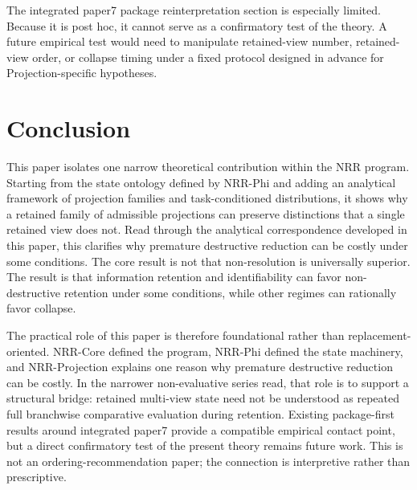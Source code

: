 \documentclass[11pt,a4paper]{article}
\begin{document}
The integrated paper7 package reinterpretation section is especially limited. Because it is post hoc, it cannot serve as a confirmatory test of the theory. A future empirical test would need to manipulate retained-view number, retained-view order, or collapse timing under a fixed protocol designed in advance for Projection-specific hypotheses.

\section{Conclusion}
\label{sec:conclusion}

This paper isolates one narrow theoretical contribution within the NRR program. Starting from the state ontology defined by NRR-Phi \cite{saito2026phi} and adding an analytical framework of projection families and task-conditioned distributions, it shows why a retained family of admissible projections can preserve distinctions that a single retained view does not. Read through the analytical correspondence developed in this paper, this clarifies why premature destructive reduction can be costly under some conditions. The core result is not that non-resolution is universally superior. The result is that information retention and identifiability can favor non-destructive retention under some conditions, while other regimes can rationally favor collapse.

The practical role of this paper is therefore foundational rather than replacement-oriented. NRR-Core \cite{saito2025nrr} defined the program, NRR-Phi \cite{saito2026phi} defined the state machinery, and NRR-Projection explains one reason why premature destructive reduction can be costly. In the narrower non-evaluative series read, that role is to support a structural bridge: retained multi-view state need not be understood as repeated full branchwise comparative evaluation during retention. Existing package-first results around integrated paper7 \cite{saito2026boundary} provide a compatible empirical contact point, but a direct confirmatory test of the present theory remains future work. This is not an ordering-recommendation paper; the connection is interpretive rather than prescriptive.
\end{document}
